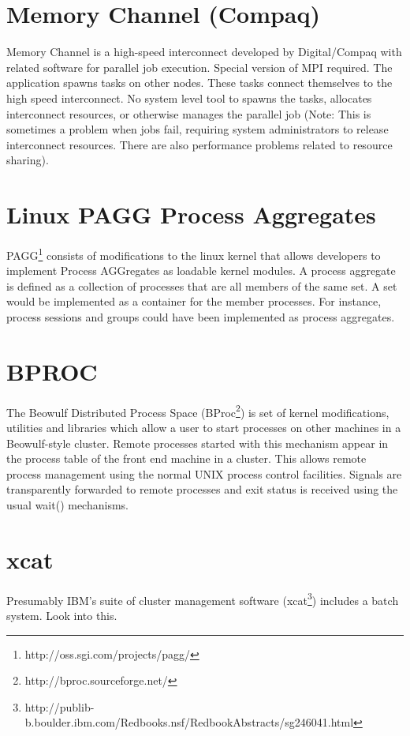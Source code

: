 \documentclass{article}
\begin{document}
\section{Memory Channel (Compaq)}

Memory Channel is a high-speed interconnect developed by
Digital/Compaq with related software for parallel job execution.
Special version of MPI required. The application spawns tasks on
other nodes. These tasks connect themselves to the high speed
interconnect. No system level tool to spawns the tasks, allocates
interconnect resources, or otherwise manages the parallel job (Note:
This is sometimes a problem when jobs fail, requiring system
administrators to release interconnect resources. There are also
performance problems related to resource sharing).

\section{Linux PAGG Process Aggregates}


PAGG\footnote{http://oss.sgi.com/projects/pagg/}
consists of modifications to the linux kernel that allows
developers to implement Process AGGregates as loadable kernel modules.
A process aggregate is defined as a collection of processes that are
all members of the same set. A set would be implemented as a container
for the member processes. For instance, process sessions and groups
could have been implemented as process aggregates.

\section{BPROC}


The Beowulf Distributed Process Space
(BProc\footnote{http://bproc.sourceforge.net/})
is set of kernel
modifications, utilities and libraries which allow a user to start
processes on other machines in a Beowulf-style cluster.  Remote
processes started with this mechanism appear in the process table
of the front end machine in a cluster. This allows remote process
management using the normal UNIX process control facilities. Signals
are transparently forwarded to remote processes and exit status is
received using the usual wait() mechanisms.

\section{xcat}

Presumably IBM's suite of cluster management software
(xcat\footnote{http://publib-b.boulder.ibm.com/Redbooks.nsf/RedbookAbstracts/sg246041.html})
includes a batch system.  Look into this.
\end{document}
